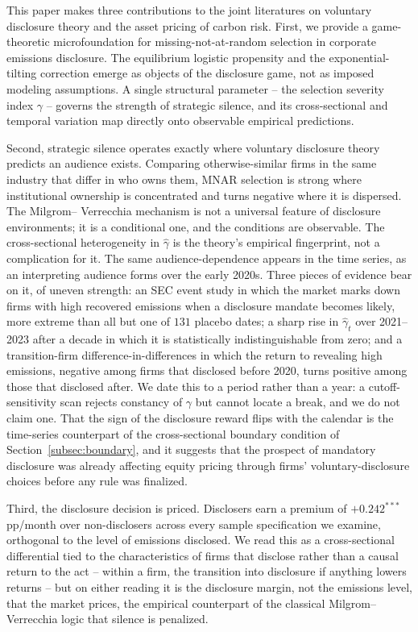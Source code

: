 \documentclass[a4paper,12pt]{article}
\begin{document}
This paper makes three contributions to the joint literatures on voluntary disclosure theory and the asset pricing of carbon risk. First, we provide a game-theoretic microfoundation for missing-not-at-random selection in corporate emissions disclosure. The equilibrium logistic propensity and the exponential-tilting correction emerge as objects of the disclosure game, not as imposed modeling assumptions. A single structural parameter --  the selection severity index $\gamma$ --  governs the strength of strategic silence, and its cross-sectional and temporal variation map directly onto observable empirical predictions.

Second, strategic silence operates exactly where voluntary disclosure theory predicts an audience exists. Comparing otherwise-similar firms in the same industry that differ in who owns them, MNAR selection is strong where institutional ownership is concentrated and turns negative where it is dispersed. The Milgrom-- Verrecchia mechanism is not a universal feature of disclosure environments; it is a conditional one, and the conditions are observable. The cross-sectional heterogeneity in $\hat\gamma$ is the theory's empirical fingerprint, not a complication for it. The same audience-dependence appears in the time series, as an interpreting audience forms over the early 2020s. Three pieces of evidence bear on it, of uneven strength: an SEC event study in which the market marks down firms with high recovered emissions when a disclosure mandate becomes likely, more extreme than all but one of $131$ placebo dates; a sharp rise in $\hat\gamma_t$ over 2021--2023 after a decade in which it is statistically indistinguishable from zero; and a transition-firm difference-in-differences in which the return to revealing high emissions, negative among firms that disclosed before 2020, turns positive among those that disclosed after. We date this to a period rather than a year: a cutoff-sensitivity scan rejects constancy of $\gamma$ but cannot locate a break, and we do not claim one. That the sign of the disclosure reward flips with the calendar is the time-series counterpart of the cross-sectional boundary condition of Section~\ref{subsec:boundary}, and it suggests that the prospect of mandatory disclosure was already affecting equity pricing through firms' voluntary-disclosure choices before any rule was finalized.

Third, the disclosure decision is priced. Disclosers earn a premium of $+0.242^{***}$ pp/month over non-disclosers across every sample specification we examine, orthogonal to the level of emissions disclosed. We read this as a cross-sectional differential tied to the characteristics of firms that disclose rather than a causal return to the act -- within a firm, the transition into disclosure if anything lowers returns -- but on either reading it is the disclosure margin, not the emissions level, that the market prices, the empirical counterpart of the classical Milgrom-- Verrecchia logic that silence is penalized.
\end{document}
